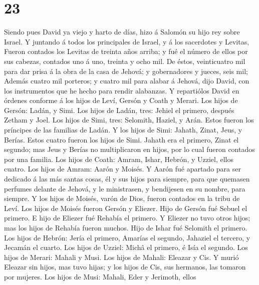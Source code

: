 \hypertarget{section-22}{%
\section{23}\label{section-22}}

 Siendo pues David ya viejo y harto de días, hizo á Salomón
su hijo rey sobre Israel.  Y juntando á todos los
principales de Israel, y á los sacerdotes y Levitas,  Fueron
contados los Levitas de treinta años arriba; y fué el número de ellos
por sus cabezas, contados uno á uno, treinta y ocho mil.  De
éstos, veinticuatro mil para dar prisa á la obra de la casa de Jehová; y
gobernadores y jueces, seis mil;  Además cuatro mil
porteros; y cuatro mil para alabar á Jehová, dijo David, con los
instrumentos que he hecho para rendir alabanzas.  Y
repartiólos David en órdenes conforme á los hijos de Leví, Gersón y
Coath y Merari.  Los hijos de Gersón: Ladán, y Simi.
 Los hijos de Ladán, tres: Jehiel el primero, después Zetham
y Joel.  Los hijos de Simi, tres: Selomith, Haziel, y Arán.
Estos fueron los príncipes de las familias de Ladán.  Y los
hijos de Simi: Jahath, Zinat, Jeus, y Berías. Estos cuatro fueron los
hijos de Simi.  Jahath era el primero, Zinat el segundo;
mas Jeus y Berías no multiplicaron en hijos, por lo cual fueron contados
por una familia.  Los hijos de Coath: Amram, Ishar, Hebrón,
y Uzziel, ellos cuatro.  Los hijos de Amram: Aarón y
Moisés. Y Aarón fué apartado para ser dedicado á las más santas cosas,
él y sus hijos para siempre, para que quemasen perfumes delante de
Jehová, y le ministrasen, y bendijesen en su nombre, para siempre.
 Y los hijos de Moisés, varón de Dios, fueron contados en
la tribu de Leví.  Los hijos de Moisés fueron Gersón y
Eliezer.  Hijo de Gersón fué Sebuel el primero.
 E hijo de Eliezer fué Rehabía el primero. Y Eliezer no
tuvo otros hijos; mas los hijos de Rehabía fueron muchos. 
Hijo de Ishar fué Selomith el primero.  Los hijos de
Hebrón: Jería el primero, Amarías el segundo, Jahaziel el tercero, y
Jecamán el cuarto.  Los hijos de Uzziel: Michâ el primero,
é Isía el segundo.  Los hijos de Merari: Mahali y Musi. Los
hijos de Mahali: Eleazar y Cis.  Y murió Eleazar sin hijos,
mas tuvo hijas; y los hijos de Cis, sus hermanos, las tomaron por
mujeres.  Los hijos de Musi: Mahali, Eder y Jerimoth, ellos
